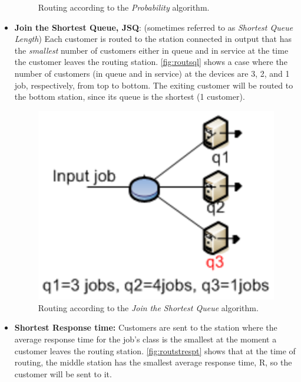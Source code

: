 \begin{itemize}
\begin{figure}[h!]
\begin{center}
    \end{center}
    \caption{Routing according to the \emph{Probability} algorithm.}
    \label{fig:routexe}
\end{figure}
\item \textbf{Join the Shortest Queue, JSQ}: (sometimes referred
to as \emph{Shortest Queue Length}) Each customer is routed to the
station connected in output that has the \emph{smallest} number of
customers either in queue and in service at the time the customer
leaves the routing station. \autoref{fig:routsql} shows a case
where the number of customers (in queue and in service) at the
devices are 3, 2, and 1 job, respectively, from top to bottom. The
exiting customer will be routed to the bottom station, since its
queue is the shortest (1 customer).
\begin{figure}[htb]
    \begin{center}
        \includegraphics[scale=.5]{img/jsimg/8.11.eps}
    \end{center}
    \caption{Routing according to the \emph{Join the Shortest Queue} algorithm.}
    \label{fig:routsql}
\end{figure}
\item \textbf{Shortest Response time:} Customers are sent to the
station where the average response time for the job's class is the
smallest at the moment a customer leaves the routing station.
\autoref{fig:routstrespt} shows that at the time of routing,
the middle station has the smallest average response time, R, so
the customer will be sent to it.
\begin{figure}[htb]

\end{figure}
\end{itemize}
